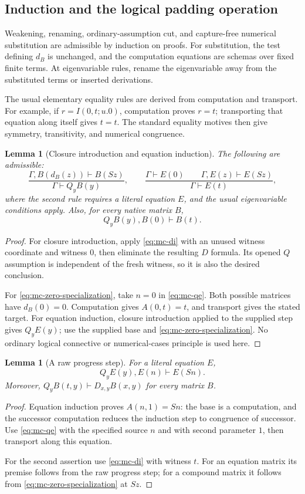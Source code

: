 \documentclass[11pt,letterpaper]{article}
\newtheorem{lemma}[theorem]{Lemma}
\theoremstyle{definition}
\theoremstyle{remark}
\begin{document}
\subsection{Induction and the logical padding operation}

Weakening, renaming, ordinary-assumption cut, and capture-free numerical
substitution are admissible by induction on proofs.  For substitution,
the test defining $d_B$ is unchanged, and the computation equations are
schemas over fixed finite terms.  At eigenvariable rules, rename the
eigenvariable away from the substituted terms or inserted derivations.

The usual elementary equality rules are derived from computation and
transport.  For example, if $r=I(0,t;u.0)$, computation proves $r=t$;
transporting that equation along itself gives $t=t$.  The standard
equality motives then give symmetry, transitivity, and numerical congruence.

\begin{lemma}[Closure introduction and equation induction]
\label{lem:mc-ei}
The following are admissible:
\[
 \frac{\Gamma,B(d_B(z))\vdash B(Sz)}{\Gamma\vdash Q_yB(y)},
 \qquad
 \frac{\Gamma\vdash E(0)\qquad\Gamma,E(z)\vdash E(Sz)}
      {\Gamma\vdash E(t)},
\]
where the second rule requires a literal equation $E$, and the usual
eigenvariable conditions apply.  Also, for every native matrix $B$,
\[
 Q_yB(y),B(0)\vdash B(t).
 \tag{MC7}\label{eq:mc-zero-specialization}
\]
\end{lemma}
\begin{proof}
For closure introduction, apply \eqref{eq:mc-di} with an unused witness
coordinate and witness $0$, then eliminate the resulting $D$ formula.
Its opened $Q$ assumption is independent of the fresh witness, so it
is also the desired conclusion.

For \eqref{eq:mc-zero-specialization}, take $n=0$ in
\eqref{eq:mc-qe}.  Both possible matrices have $d_B(0)=0$.
Computation gives $A(0,t)=t$, and transport gives the stated target.
For equation induction, closure introduction applied to the supplied
step gives $Q_yE(y)$; use the supplied base and
\eqref{eq:mc-zero-specialization}.  No ordinary logical connective
or numerical-cases principle is used here.
\end{proof}

\begin{lemma}[A raw progress step]
\label{lem:mc-step}
For a literal equation $E$,
\[
 Q_yE(y),E(n)\vdash E(Sn).
\]
Moreover, $Q_yB(t,y)\vdash D_{x,y}B(x,y)$ for every matrix $B$.
\end{lemma}
\begin{proof}
Equation induction proves $A(n,1)=Sn$: the base is a computation,
and the successor computation reduces the induction step to congruence
of successor.  Use \eqref{eq:mc-qe} with the specified source $n$ and
with second parameter $1$, then transport along this equation.

For the second assertion use \eqref{eq:mc-di} with witness $t$.
For an equation matrix its premise follows from the raw progress step;
for a compound matrix it follows from
\eqref{eq:mc-zero-specialization} at $Sz$.
\end{proof}
\end{document}
